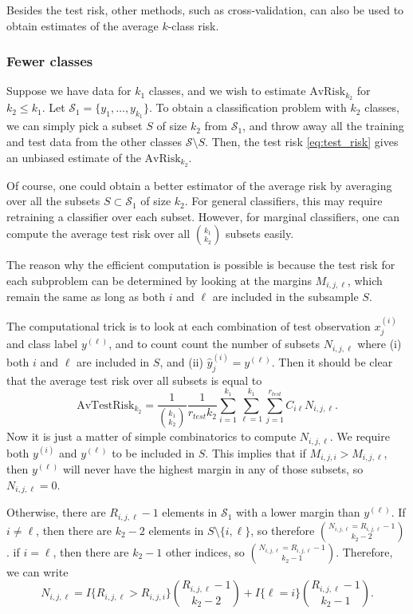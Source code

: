 \documentclass[12pt]{article}
\begin{document}
Besides the test risk, other methods, such as cross-validation, can
also be used to obtain estimates of the average $k$-class risk.

\subsubsection{Fewer classes}

Suppose we have data for $k_1$ classes, and we wish to estimate
$\text{AvRisk}_{k_2}$ for $k_2 \leq k_1$.  Let $\mathcal{S}_1
= \{y_1,\hdots,y_{k_1}\}$.  To obtain a classification problem with
$k_2$ classes, we can simply pick a subset $S$ of size $k_2$ from
$\mathcal{S}_1$, and throw away all the training and test data from the
other classes $\mathcal{S}\setminus S$.  Then, the test
risk \eqref{eq:test_risk} gives an unbiased estimate of the
$\text{AvRisk}_{k_2}$.

Of course, one could obtain a better estimator of the average risk by
averaging over all the subsets $S \subset \mathcal{S}_1$ of size
$k_2$.  For general classifiers, this may require retraining a
classifier over each subset.  However, for marginal classifiers, one
can compute the average test risk over all ${k_1}\choose{k_2}$ subsets
easily.

The reason why the efficient computation is possible is because the
test risk for each subproblem can be determined by looking at the
margins $M_{i, j, \ell}$, which remain the same as long as both $i$
and $\ell$ are included in the subsample $S$.

The computational trick is to look at each combination of test
observation $x_j^{(i)}$ and class label $y^{(\ell)}$, and to count
count the number of subsets $N_{i, j, \ell}$ where (i) both $i$ and
$\ell$ are included in $S$, and (ii) $\hat{y}_j^{(i)} = y^{(\ell)}$.
Then it should be clear that the average test risk over all subsets is
equal to
\begin{equation}\label{eq:avtestrisk}
\text{AvTestRisk}_{k_2} = \frac{1}{{{k_1}\choose{k_2}}}\frac{1}{r_{test}k_2} \sum_{i=1}^{k_1} \sum_{\ell=1}^{k_1} \sum_{j=1}^{r_{test}} C_{i\ell}N_{i, j, \ell}.
\end{equation}
Now it is just a matter of simple combinatorics to compute
$N_{i,j,\ell}$.  We require both $y^{(i)}$ and $y^{(\ell)}$ to be
included in $S$.  This implies that if $M_{i,j,i} > M_{i,j,\ell}$,
then $y^{(\ell)}$ will never have the highest margin in any of those
subsets, so $N_{i,j,\ell} = 0$.

Otherwise, there are $R_{i,j,\ell} - 1$ elements in $\mathcal{S}_1$
with a lower margin than $y^{(\ell)}$.  If $i \neq \ell$, then there
are $k_2-2$ elements in $S \setminus \{i, \ell\}$, so therefore $N_{i,
j, \ell} = {R_{i,j,\ell} - 1}\choose{k_2 - 2}$.  if $i = \ell$, then
there are $k_2 - 1$ other indices, so $N_{i,j,\ell} = {R_{i,j,\ell} -
1}\choose{k_2 - 1}$.  Therefore, we can write
\begin{equation}\label{eq:avtestrisk_nil}
N_{i,j,\ell} = I\{R_{i,j,\ell} > R_{i,j,i}\}{{R_{i,j,\ell} -
1}\choose{k_2 - 2}} + I\{\ell = i\}{{R_{i,j,\ell} - 1}\choose{k_2 - 1}}.
\end{equation}
\end{document}
